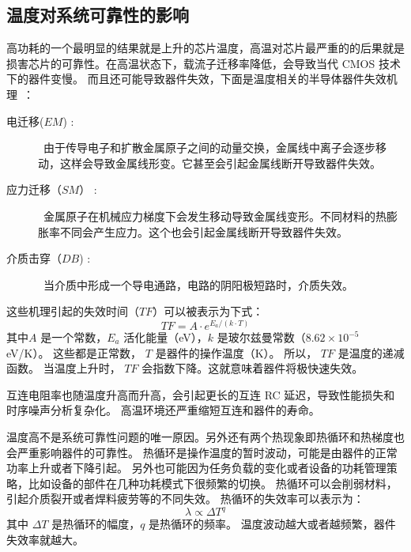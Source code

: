 \subsection{温度对系统可靠性的影响}\label{sec:reliability}
高功耗的一个最明显的结果就是上升的芯片温度，高温对芯片最严重的的后果就是损害芯片的可靠性。在高温状态下，载流子迁移率降低，会导致当代 CMOS 技术下的器件变慢。
而且还可能导致器件失效，下面是温度相关的半导体器件失效机理~：
\begin{description}
\item[电迁移($EM$) :] ~由于传导电子和扩散金属原子之间的动量交换，金属线中离子会逐步移动，这样会导致金属线形变。它甚至会引起金属线断开导致器件失效。
\item[应力迁移（$SM$） :] ~金属原子在机械应力梯度下会发生移动导致金属线变形。不同材料的热膨胀率不同会产生应力。这个也会引起金属线断开导致器件失效。
\item[介质击穿（$DB$) :] ~当介质中形成一个导电通路，电路的阴阳极短路时，介质失效。
\end{description}

这些机理引起的失效时间（$TF$）可以被表示为下式：
\begin{equation}
TF = A \cdot e^{E_a/(k \cdot T)}
\end{equation}
其中$A$ 是一个常数，$E_a$ 活化能量（eV），$k$ 是玻尔兹曼常数（$8.62 \times 10^{-5}$ eV/K）。
这些都是正常数， $T$ 是器件的操作温度（K）。
所以， $TF$ 是温度的递减函数。
当温度上升时， $TF$ 会指数下降。这就意味着器件将极快速失效。

互连电阻率也随温度升高而升高，会引起更长的互连 RC 延迟，导致性能损失和时序噪声分析复杂化。
高温环境还严重缩短互连和器件的寿命。

温度高不是系统可靠性问题的唯一原因。另外还有两个热现象即热循环和热梯度也会严重影响器件的可靠性。
热循环是操作温度的暂时波动，可能是由器件的正常功率上升或者下降引起。
另外也可能因为任务负载的变化或者设备的功耗管理策略，比如设备的部件在几种功耗模式下很频繁的切换。
热循环可以会削弱材料，引起介质裂开或者焊料疲劳等的不同失效。
热循环的失效率可以表示为：
\begin{equation}
\lambda \propto \Delta T^q
\end{equation}
其中 $\Delta T$ 是热循环的幅度，$q$ 是热循环的频率。
温度波动越大或者越频繁，器件失效率就越大。


